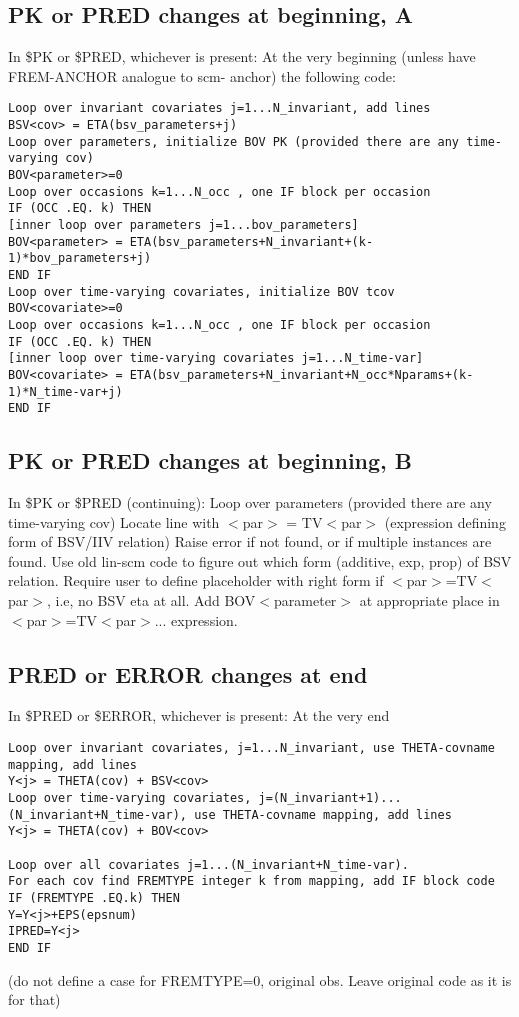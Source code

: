 \subsection{PK or PRED changes at beginning, A}
In \$PK or \$PRED, whichever is present:
At the very beginning (unless have FREM-ANCHOR analogue to scm- anchor) the following code: 
\begin{verbatim}
Loop over invariant covariates j=1...N_invariant, add lines
BSV<cov> = ETA(bsv_parameters+j)
Loop over parameters, initialize BOV PK (provided there are any time-varying cov)
BOV<parameter>=0
Loop over occasions k=1...N_occ , one IF block per occasion
IF (OCC .EQ. k) THEN
[inner loop over parameters j=1...bov_parameters]
BOV<parameter> = ETA(bsv_parameters+N_invariant+(k-1)*bov_parameters+j)
END IF
Loop over time-varying covariates, initialize BOV tcov
BOV<covariate>=0
Loop over occasions k=1...N_occ , one IF block per occasion
IF (OCC .EQ. k) THEN
[inner loop over time-varying covariates j=1...N_time-var]
BOV<covariate> = ETA(bsv_parameters+N_invariant+N_occ*Nparams+(k-1)*N_time-var+j)
END IF
\end{verbatim}

\subsection{PK or PRED changes at beginning, B}
In \$PK or \$PRED (continuing):
Loop over parameters (provided there are any time-varying cov)
Locate line with 
$<$par$>$ = TV$<$par$>$ (expression defining form of BSV/IIV relation)
Raise error if not found, or if multiple instances are found. Use old lin-scm code to figure out which form (additive, exp, prop) of BSV relation. Require user to define placeholder with right form if $<$par$>$=TV$<$par$>$, i.e, no BSV eta at all. Add BOV$<$parameter$>$ at appropriate place in $<$par$>$=TV$<$par$>$... expression.

\subsection{PRED or ERROR changes at end}
In \$PRED or \$ERROR, whichever is present:
At the very end
\begin{verbatim}
Loop over invariant covariates, j=1...N_invariant, use THETA-covname mapping, add lines
Y<j> = THETA(cov) + BSV<cov>
Loop over time-varying covariates, j=(N_invariant+1)...(N_invariant+N_time-var), use THETA-covname mapping, add lines
Y<j> = THETA(cov) + BOV<cov>

Loop over all covariates j=1...(N_invariant+N_time-var).
For each cov find FREMTYPE integer k from mapping, add IF block code 
IF (FREMTYPE .EQ.k) THEN
Y=Y<j>+EPS(epsnum)
IPRED=Y<j>
END IF
\end{verbatim}
(do not define a case for FREMTYPE=0, original obs. Leave original code as it is for that)


